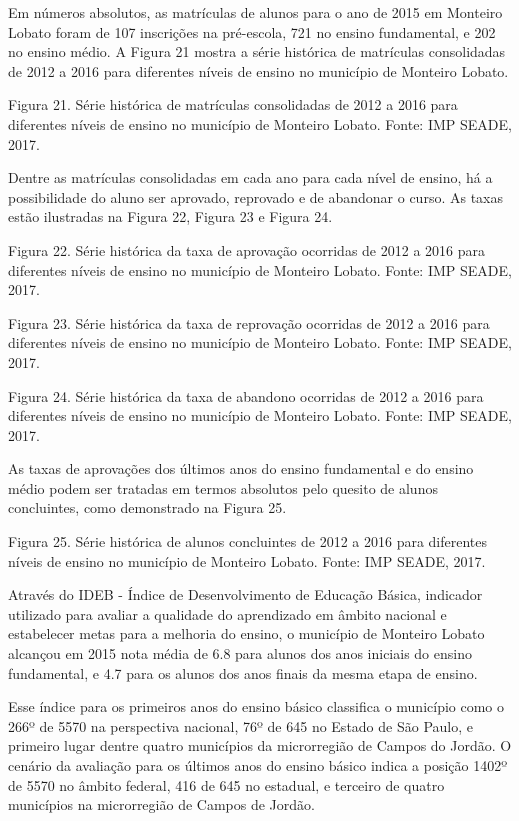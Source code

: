 Em números absolutos, as matrículas de alunos para o ano de 2015 em Monteiro Lobato foram de 107 inscrições na pré-escola, 721 no ensino fundamental, e 202 no ensino médio. A Figura 21 mostra a série histórica de matrículas consolidadas de 2012 a 2016 para diferentes níveis de ensino no município de Monteiro Lobato.

Figura 21. Série histórica de matrículas consolidadas de 2012 a 2016 para diferentes níveis de ensino no município de Monteiro Lobato.
Fonte: IMP SEADE, 2017.

Dentre as matrículas consolidadas em cada ano para cada nível de ensino, há a possibilidade do aluno ser aprovado, reprovado e de abandonar o curso. As taxas estão ilustradas na Figura 22, Figura 23 e Figura 24.

Figura 22. Série histórica da taxa de aprovação ocorridas de 2012 a 2016 para diferentes níveis de ensino no município de Monteiro Lobato.
Fonte: IMP SEADE, 2017.

Figura 23. Série histórica da taxa de reprovação ocorridas de 2012 a 2016 para diferentes níveis de ensino no município de Monteiro Lobato.
Fonte: IMP SEADE, 2017.

Figura 24. Série histórica da taxa de abandono ocorridas de 2012 a 2016 para diferentes níveis de ensino no município de Monteiro Lobato.
Fonte: IMP SEADE, 2017.

As taxas de aprovações dos últimos anos do ensino fundamental e do ensino médio podem ser tratadas em termos absolutos pelo quesito de alunos concluintes, como demonstrado na Figura 25.

Figura 25. Série histórica de alunos concluintes de 2012 a 2016 para diferentes níveis de ensino no município de Monteiro Lobato.
Fonte: IMP SEADE, 2017.

Através do IDEB - Índice de Desenvolvimento de Educação Básica, indicador utilizado para avaliar a qualidade do aprendizado em âmbito nacional e estabelecer metas para a melhoria do ensino, o município de Monteiro Lobato alcançou em 2015 nota média de 6.8 para alunos dos anos iniciais do ensino fundamental, e 4.7 para os alunos dos anos finais da mesma etapa de ensino.

Esse índice para os primeiros anos do ensino básico classifica o município como o 266º de 5570 na perspectiva nacional, 76º de 645 no Estado de São Paulo, e primeiro lugar dentre quatro municípios da microrregião de Campos do Jordão. O cenário da avaliação para os últimos anos do ensino básico indica a posição 1402º de 5570 no âmbito federal, 416 de 645 no estadual, e terceiro de quatro municípios na microrregião de Campos de Jordão.
	
